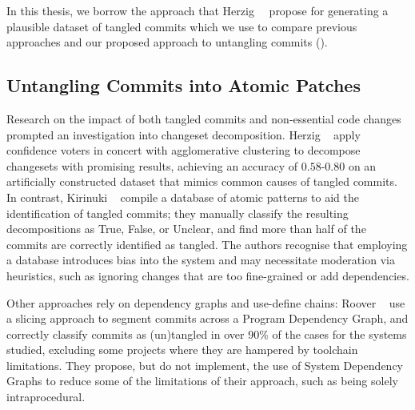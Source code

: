 In this thesis, we borrow the approach that Herzig~\etal~\cite{Herzig2016}
propose for generating a plausible dataset of tangled commits which we use to
compare previous approaches and our proposed approach to untangling commits
().

\subsection{Untangling Commits into Atomic Patches}
\label{chapter:literature:sec:flexeme_rel_work:untangle}

Research on the impact of both tangled commits and non-essential code changes
prompted an investigation into changeset decomposition. Herzig
\etal~\cite{Herzig2013, Herzig2016} apply confidence voters in concert with
agglomerative clustering to decompose changesets with promising results,
achieving an accuracy of $0.58$-$0.80$ on an artificially constructed dataset
that mimics common causes of tangled commits. In contrast, Kirinuki
\etal~\cite{Kirinuki2014, Kirinuki2017} compile a database of atomic patterns to
aid the identification of tangled commits; they manually classify the resulting
decompositions as True, False, or Unclear, and find more than half of the
commits are correctly identified as tangled. The authors recognise that
employing a database introduces bias into the system and may necessitate
moderation via heuristics, such as ignoring changes that are too fine-grained or
add dependencies.

Other approaches rely on dependency graphs and use-define chains: Roover
\etal~\cite{Roover2017} use a slicing approach to segment commits across a
Program Dependency Graph, and correctly classify commits as (un)tangled in over
90\% of the cases for the systems studied, excluding some projects where they
are hampered by toolchain limitations. They propose, but do not implement, the
use of System Dependency Graphs to reduce some of the limitations of their
approach, such as being solely intraprocedural.

